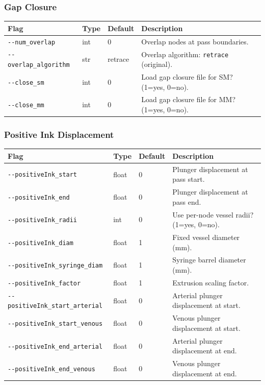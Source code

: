 \documentclass[11pt,letterpaper]{article}
\newcommand{\code}[1]{\texttt{#1}}
\begin{document}
\subsubsection{Gap Closure}

\begin{tabularx}{\textwidth}{L{3.8cm} l l X}
\toprule
\textbf{Flag} & \textbf{Type} & \textbf{Default} & \textbf{Description} \\
\midrule
\code{-{}-num\_overlap} & int & 0 & Overlap nodes at pass boundaries. \\
\code{-{}-overlap\_algorithm} & str & retrace & Overlap algorithm: \code{retrace} (original). \\
\code{-{}-close\_sm} & int & 0 & Load gap closure file for SM? (1=yes, 0=no). \\
\code{-{}-close\_mm} & int & 0 & Load gap closure file for MM? (1=yes, 0=no). \\
\bottomrule
\end{tabularx}

\subsubsection{Positive Ink Displacement}

\begin{tabularx}{\textwidth}{L{4.5cm} l l X}
\toprule
\textbf{Flag} & \textbf{Type} & \textbf{Default} & \textbf{Description} \\
\midrule
\code{-{}-positiveInk\_start} & float & 0 & Plunger displacement at pass start. \\
\code{-{}-positiveInk\_end} & float & 0 & Plunger displacement at pass end. \\
\code{-{}-positiveInk\_radii} & int & 0 & Use per-node vessel radii? (1=yes, 0=no). \\
\code{-{}-positiveInk\_diam} & float & 1 & Fixed vessel diameter (mm). \\
\code{-{}-positiveInk\_syringe\_diam} & float & 1 & Syringe barrel diameter (mm). \\
\code{-{}-positiveInk\_factor} & float & 1 & Extrusion scaling factor. \\
\code{-{}-positiveInk\_start\_arterial} & float & 0 & Arterial plunger displacement at start. \\
\code{-{}-positiveInk\_start\_venous} & float & 0 & Venous plunger displacement at start. \\
\code{-{}-positiveInk\_end\_arterial} & float & 0 & Arterial plunger displacement at end. \\
\code{-{}-positiveInk\_end\_venous} & float & 0 & Venous plunger displacement at end. \\
\bottomrule
\end{tabularx}
\end{document}
